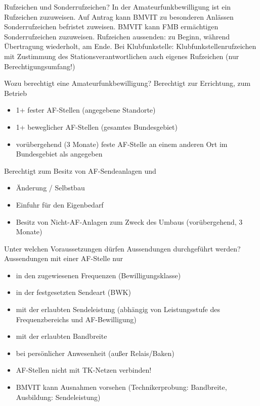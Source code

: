 \documentclass[avery5371,grid,frame,a4paper]{flashcards}
\newcommand{\card}[3]{
  \begin{flashcard}[{\chap} -- #1]{#2}#3\end{flashcard}
}
\begin{document}

\card{28}{Rufzeichen und Sonderrufzeichen?}{
  In der Amateurfunkbewilligung ist ein Rufzeichen zuzuweisen.
  Auf Antrag kann BMVIT zu besonderen Anlässen Sonderrufzeichen befristet zuweisen.
  BMVIT kann FMB ermächtigen Sonderrufzeichen zuzuweisen.
  Rufzeichen aussenden: zu Beginn, während Übertragung wiederholt, am Ende.
  Bei Klubfunkstelle: Klubfunkstellenrufzeichen mit Zustimmung des Stationsverantwortlichen auch eigenes Rufzeichen (nur Berechtigungsumfang!)
}

\card{29}{Wozu berechtigt eine Amateurfunkbewilligung?}{
  \small
  Berechtigt zur Errichtung, zum Betrieb
  \begin{itemize}
    \item 1+ fester AF-Stellen (angegebene Standorte)
    \item 1+ beweglicher AF-Stellen (gesamtes Bundesgebiet)
    \item vorübergehend (3 Monate) feste AF-Stelle an einem anderen Ort im Bundesgebiet als angegeben
  \end{itemize}
  Berechtigt zum Besitz von AF-Sendeanlagen und
  \begin{itemize}
    \item Änderung / Selbstbau
    \item Einfuhr für den Eigenbedarf
    \item Besitz von Nicht-AF-Anlagen zum Zweck des Umbaus (vorübergehend, 3 Monate)
  \end{itemize}
}

\card{30}{Unter welchen Voraussetzungen dürfen Aussendungen durchgeführt werden?}{
  \small
  Aussendungen mit einer AF-Stelle nur
  \begin{itemize}[leftmargin=10pt]
    \item in den zugewiesenen Frequenzen (Bewilligungsklasse)
    \item in der festgesetzten Sendeart (BWK)
    \item mit der erlaubten Sendeleistung (abhängig von Leistungsstufe des Frequenzbereichs und AF-Bewilligung)
    \item mit der erlaubten Bandbreite
    \item bei persönlicher Anwesenheit (außer Relais/Baken)
    \item AF-Stellen nicht mit TK-Netzen verbinden!
    \item BMVIT kann Ausnahmen vorsehen (Technikerprobung: Bandbreite, Ausbildung: Sendeleistung)
  \end{itemize}
}
\end{document}
